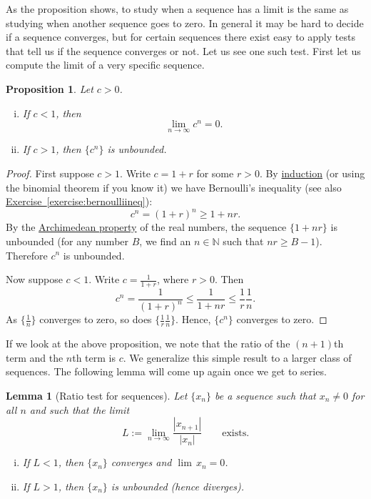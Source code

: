 \documentclass[12pt]{book}
\newcommand{\abs}[1]{\left\lvert {#1} \right\rvert}
\newcommand{\N}{{\mathbb{N}}}
\theoremstyle{plain}
\newtheorem{lemma}[thm]{Lemma}
\newtheorem{prop}[thm]{Proposition}
\theoremstyle{remark}
\theoremstyle{definition}
\theoremstyle{exercise}
\theoremstyle{example}
\newcommand{\exerciseref}[1]{\hyperref[#1]{Exercise~\ref*{#1}}}
\begin{document}
As the proposition shows, to study when a sequence has a limit is 
the same as studying when another sequence goes to zero.
In general it may be hard to decide if a sequence converges, but
for certain sequences there exist easy to apply tests that tell us
if the sequence converges or not.  Let us see one such test.
First let
us compute the limit of a very specific sequence.
\begin{prop}
Let $c > 0$.
\begin{enumerate}[(i)]
\item
If $c < 1$, then
\begin{equation*}
\lim_{n\to\infty} c^n = 0.
\end{equation*}
\item
If $c > 1$, then $\{ c^n \}$ is unbounded.
\end{enumerate}
\end{prop}

\begin{proof}
First suppose $c > 1$.  Write
$c = 1+r$ for some $r > 0$.  By \hyperref[induction:thm]{induction} (or using the binomial theorem
if you know it) we have Bernoulli's inequality (see also
\exerciseref{exercise:bernoulliineq}):
\begin{equation*}
c^n = {(1+r)}^n \geq 1+nr .
\end{equation*}
By the \hyperref[thm:arch:i]{Archimedean property}
of the real numbers, the sequence $\{ 1+nr \}$
is unbounded (for any number $B$, we find an $n \in \N$ such that $nr \geq
B-1$).  Therefore $c^n$ is unbounded.

Now suppose $c < 1$.  Write $c = \frac{1}{1+r}$, where $r > 0$.  Then
\begin{equation*}
c^n = \frac{1}{{(1+r)}^n} \leq
\frac{1}{1+nr} \leq \frac{1}{r} \frac{1}{n} .
\end{equation*}
As $\{ \frac{1}{n} \}$ converges to zero, so does
$\{ \frac{1}{r} \frac{1}{n} \}$.  Hence, $\{ c^n \}$ converges to zero.
\end{proof}

If we look at the above proposition, we note that the
ratio of the $(n+1)$th term and the $n$th term is $c$.  We 
generalize this simple result to a larger class of sequences.
The following lemma will come up again once we get to series.

\begin{lemma}[Ratio test for sequences]
\label{seq:ratiotest}
Let $\{ x_n \}$ be a sequence such that $x_n \not= 0$ for all $n$ and such that
the limit
\begin{equation*}
L := \lim_{n\to\infty} \frac{\abs{x_{n+1}}}{\abs{x_n}}
\qquad
\text{exists.}
\end{equation*}
\begin{enumerate}[(i)]
\item
If $L < 1$, then $\{ x_n \}$ converges and $\lim\, x_n = 0$.
\item
If $L > 1$, then $\{ x_n \}$ is unbounded (hence diverges).
\end{enumerate}
\end{lemma}
\end{document}
